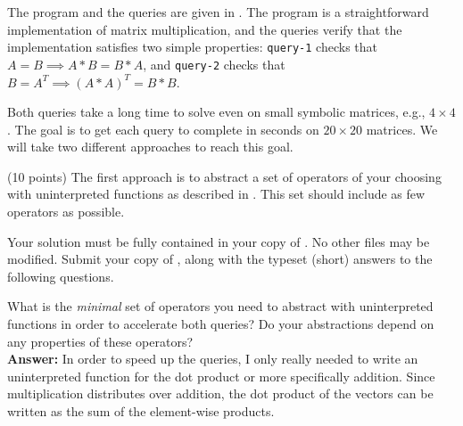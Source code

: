 \documentclass{handout}
\begin{document}
The program and the queries are given in .  The program is
a straightforward implementation of matrix multiplication, and the queries
verify that the implementation satisfies two simple properties: \texttt{query-1}
checks that $A = B \implies A*B = B*A$, and \texttt{query-2} checks that $B =
A^T \implies (A*A)^T = B*B$.

Both queries take a long time to solve even on small symbolic matrices, e.g.,
$4\times4$.  The goal is to get each query to complete in seconds on
$20\times20$ matrices.  We will take two different approaches to reach this
goal.

\begin{questions}
\item \label{prob:uf:first} (10 points) The first approach is to abstract a set
of operators of your choosing with uninterpreted functions as described in
.  This set should include as few operators as possible.

Your solution must be fully contained in your copy of .  No
other files may be modified.  Submit your copy of , along with
the typeset (short) answers to the following questions.

What is the \emph{minimal} set of operators you need to abstract with
uninterpreted functions in order to accelerate both queries?   Do your
abstractions depend on any properties of these operators?\\

\textbf{Answer:}
In order to speed up the queries, I only really needed to write an uninterpreted function for the dot product or more specifically addition. Since multiplication distributes over addition, the dot product of the vectors can be written as the sum of the element-wise products.




\end{questions}
\end{document}
